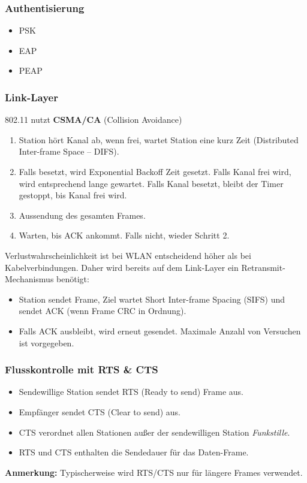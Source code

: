 \documentclass{article} %
\begin{document}
\subsubsection{Authentisierung}
\begin{itemize}
	\item PSK
	\item EAP
	\item PEAP
\end{itemize}

\subsubsection{Link-Layer}
802.11 nutzt \textbf{CSMA/CA} (Collision Avoidance)
\begin{enumerate}
	\item Station hört Kanal ab, wenn frei, wartet Station eine	kurz Zeit (Distributed Inter-frame Space – DIFS).
	\item Falls besetzt, wird Exponential Backoff Zeit gesetzt. Falls Kanal frei wird, wird entsprechend lange gewartet. Falls Kanal besetzt, bleibt der Timer gestoppt, bis Kanal frei wird.
	\item Aussendung des gesamten Frames.
	\item Warten, bis ACK ankommt. Falls nicht, wieder Schritt 2.
\end{enumerate}

Verlustwahrscheinlichkeit ist bei WLAN entscheidend höher als bei Kabelverbindungen.
Daher wird bereits auf dem Link-Layer ein Retransmit-Mechanismus benötigt:
\begin{itemize}
	\item Station sendet Frame, Ziel wartet Short Inter-frame Spacing (SIFS) und sendet ACK (wenn Frame	CRC in Ordnung).
	\item Falls ACK ausbleibt, wird erneut gesendet. Maximale Anzahl von Versuchen ist vorgegeben.
\end{itemize}
\subsubsection{Flusskontrolle mit RTS \& CTS}
\begin{itemize}
	\item Sendewillige Station sendet RTS (Ready to send)
	Frame aus.
	\item Empfänger sendet CTS (Clear to send) aus.
	\item CTS verordnet allen Stationen außer der sendewilligen Station \emph{Funkstille}.
	\item RTS und CTS enthalten die Sendedauer für das Daten-Frame.
\end{itemize}
\textbf{Anmerkung: }Typischerweise wird RTS/CTS nur für längere Frames verwendet.
\end{document}
